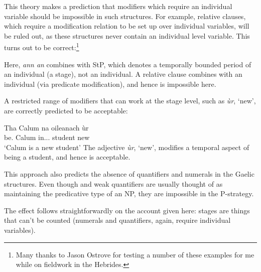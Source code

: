 \documentclass[output=paper]{langsci/langscibook}
\begin{document}
This theory makes a prediction that modifiers which require an individual
variable should be impossible in such structures. For example, relative
clauses, which require a modification relation to be set up over individual
variables, will be ruled out, as these structures never contain an individual
level variable. This turns out to be correct:\footnote{Many thanks to Jason
Ostrove for testing a number of these examples for me while on fieldwork in the
Hebrides.}

\ea {}
\z
Here, \emph{ann an} combines with StP, which denotes a temporally bounded
period of an individual (a stage), not an individual. A relative clause
combines with an individual (via predicate modification), and hence is
impossible here.

A restricted range of modifiers that can work at the stage level, such as
\emph{\`ur}, `new', are correctly predicted to be acceptable:

\ea {}
\sn \gll Tha Calum na oileanach \`ur\\
be.\Prs{} Calum in.\Poss.\Tsg.\M{} student new\\
\glt \enquote*{Calum is a new student}
\z
The adjective \emph{\`ur}, `new', modifies a temporal aspect of being a
student, and hence is acceptable.

This approach also predicts the absence of quantifiers and
numerals in the Gaelic structures.  Even though  and weak quantifiers are usually thought of as
maintaining the predicative type of an NP, they are impossible in the
P-strategy.

\ea {}
\z \z
The effect follows straightforwardly on the account given here: stages are things that can't be counted (numerals and quantifiers,
again, require individual variables).
\end{document}
